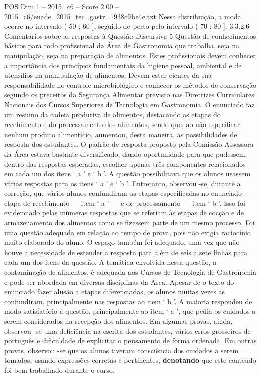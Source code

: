 \begin{textsample}{POS Dim 1 – 2015\_c6 – Score 2.00 – 2015\_c6/enade\_2015\_tec\_gastr\_1938c9be4e.txt}
Nessa distribuição, a moda ocorre no intervalo ( 50 ; 60 ], seguido de perto pelo intervalo ( 70 ; 80 ]. 3.3.2.6 Comentários sobre as respostas à Questão Discursiva 5 Questão de conhecimentos básicos para todo profissional da Área de Gastronomia que trabalha, seja na manipulação, seja na preparação de alimentos.
Estes profissionais devem conhecer a importância dos princípios fundamentais da higiene pessoal, ambiental e de utensílios na manipulação de alimentos.
Devem estar cientes da sua responsabilidade no controle microbiológico e conhecer os métodos de conservação segundo os preceitos da Segurança Alimentar previsto nas Diretrizes Curriculares Nacionais dos Cursos Superiores de Tecnologia em Gastronomia.
O enunciado faz um resumo da cadeia produtiva de alimentos, destacando as etapas do recebimento e do processamento dos alimentos, sendo que, ao não especificar nenhum produto alimentício, aumentou, desta maneira, as possibilidades de resposta dos estudantes.
O padrão de resposta proposto pela Comissão Assessora da Área estava bastante diversificado, dando oportunidade para que pudessem, dentro das respostas esperadas, escolher apenas três componentes relacionados em cada um dos itens ‘ a ’ e ‘ b ’.
A questão possibilitava que os alunos usassem várias respostas para os itens ‘ a ’ e ‘ b ’.
Entretanto, observou -se, durante a correção, que vários alunos confundiram as etapas especificadas no enunciado : etapa de recebimento — item ‘ a ’ — e de processamento — item ‘ b ’.
Isso foi evidenciado pelas inúmeras respostas que se referiam às etapas de cocção e de armazenamento dos alimentos como se fizessem parte de um mesmo processo.
Foi uma questão adequada em relação ao tempo de prova, pois não exigia raciocínio muito elaborado do aluno.
O espaço também foi adequado, uma vez que não houve a necessidade de estender a resposta para além de seis a sete linhas para cada um dos itens da questão.
A temática envolvida nessa questão, a contaminação de alimentos, é adequada aos Cursos de Tecnologia de Gastronomia e pode ser abordada em diversas disciplinas da Área.
Apesar de o texto do enunciado fazer alusão a etapas diferenciadas, os alunos muitas vezes as confundiram, principalmente nas respostas ao item ‘ b ’.
A maioria respondeu de modo satisfatório à questão, principalmente ao item ‘ a ’, que pedia os cuidados a serem considerados na recepção dos alimentos.
Em algumas provas, ainda, observou -se uma deficiência na escrita dos estudantes, vários erros grosseiros de português e dificuldade de explicitar o pensamento de forma ordenada.
Em outras provas, observou -se que os alunos tiveram consciência dos cuidados a serem tomados, usando expressões corretas e pertinentes, \textbf{denotando} que este conteúdo foi bem trabalhado durante o curso.

\end{textsample}
